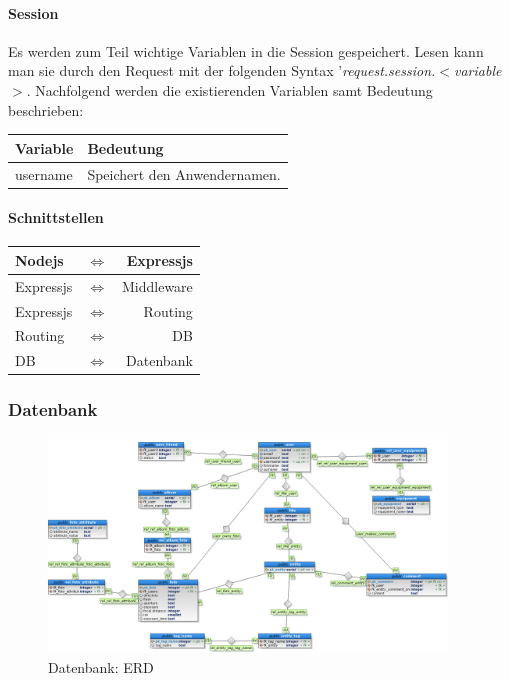 \documentclass[a4paper,bibtotoc,oneside]{scrartcl}	%
\begin{document}
			\paragraph{Session}
			Es werden zum Teil wichtige Variablen in die Session gespeichert. Lesen kann man sie durch den Request mit der folgenden Syntax '\textit{request.session.$<$variable$>$}. Nachfolgend werden die existierenden Variablen samt Bedeutung beschrieben:
			
			\begin{center}
			\begin{tabular}{|l|l|}
			\hline
			\bf Variable & \bf Bedeutung \\
			\hline
			username & Speichert den Anwendernamen. \\
			\hline
			\end{tabular}
			\end{center}
			
			\paragraph{Schnittstellen}
			\begin{center}
			\begin{tabular}{|lcr|}
			\hline
			Nodejs & $\Leftrightarrow$ & Expressjs \\
			\hline
			Expressjs & $\Leftrightarrow$ & Middleware \\
			\hline
			Expressjs & $\Leftrightarrow$ & Routing \\
			\hline
			Routing & $\Leftrightarrow$ & DB \\
			\hline
			DB & $\Leftrightarrow$ & Datenbank \\
			\hline
			\end{tabular}
			\end{center}
			
		\subsubsection{Datenbank}

			\begin{figure}[H]
			\centering
			\includegraphics[width=400px]{Mockups/db_v1.png}
			\caption{Datenbank: ERD}
			\end{figure}
\end{document}
